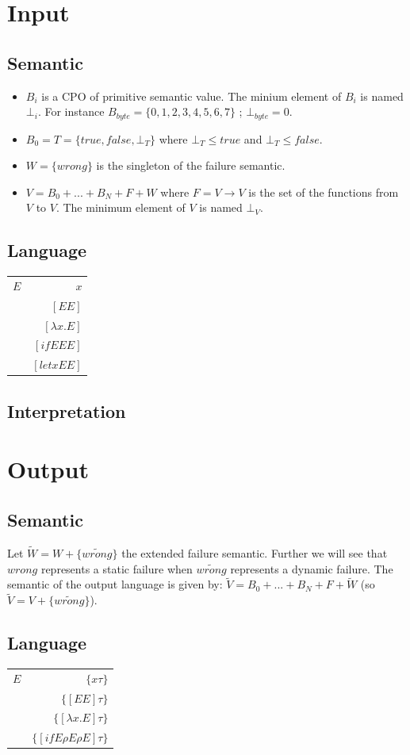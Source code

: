 \documentclass[a4paper]{report}
\begin{document}
\section{Input}
\subsection{Semantic}
\begin{itemize}
\item $B_i$ is a CPO of primitive semantic value. The minium element of $B_i$ is named $\bot_i$. For instance $B_{byte}=\{0,1,2,3,4,5,6,7\}$ ;  $\bot_{byte}=0$.
\item $B_0=T=\{true,false,\bot_T\}$ where $\bot_T \leq true$ and $\bot_T \leq false$.
\item $W=\{wrong\}$ is the singleton of the failure semantic.
\item $V = B_0 + ... + B_N + F + W$ where $F = V \to V$ is the set of the functions from $V$ to $V$. The minimum element of $V$ is named $\bot_V$.
\end{itemize}
\subsection{Language}
\begin{tabular}{|l|r|}
\hline
$E$ & $x$\\
& $[E E]$\\
& $[\lambda x.E]$\\
& $[if E E E]$\\
& $[let x E E]$\\
\hline
\end{tabular}
\subsection{Interpretation}

\section{Output}
\subsection{Semantic}
Let $\tilde W = W + \{\tilde{wrong}\}$ the extended failure semantic. Further we will see that $wrong$ represents a static failure when $\tilde{wrong}$ represents a dynamic failure. The semantic of the output language is given by: $\tilde V = B_0 + ... + B_N + F + \tilde W$ (so $\tilde V = V + \{\tilde{wrong}\}$). 
\subsection{Language}
\begin{tabular}{|l|r|}
\hline
$E$ & $\{x \tau\}$\\
& $\{[E E] \tau\}$\\
& $\{[\lambda x.E]\tau\}$\\
& $\{[if E \rho E\rho E]\tau\}$\\
\hline
\end{tabular}
\end{document}
